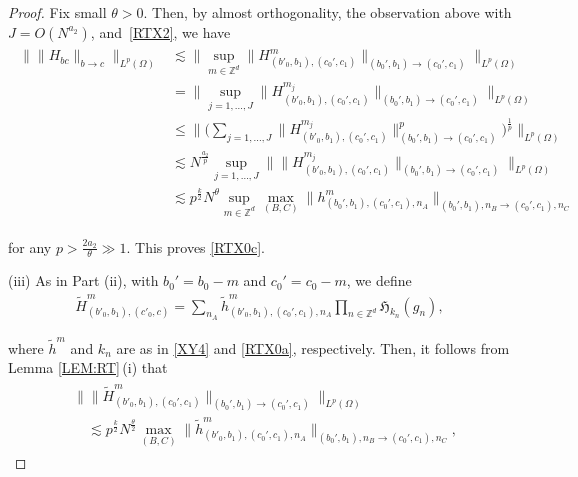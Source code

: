 \documentclass[%
11pt,  reqno]{amsart}
\newcommand{\1}{\hspace{0.2mm}\text{I}\hspace{0.2mm}}
\newcommand{\noi}{\noindent}
\newcommand{\Z}{\mathbb{Z}}
\newcommand{\wt}{\widetilde}
\newcommand{\ta}{\theta}
\renewcommand{\O}{\Omega}
\newcommand{\les}{\lesssim}
\numberwithin{equation}{section}
\numberwithin{theorem}{section}
\newcommand{\Hf}{\mathfrak{H}}
\begin{document}
\begin{proof}
Fix small $\ta > 0$.
Then, by almost orthogonality, the observation above
with $J =O(N^{a_2})$,  and~\eqref{RTX2}, we have
\begin{align}
\begin{split}
\big\| \| H_{bc} \|_{b \to c} \big\|_{L^p(\O)}  
& \les \Big\| \sup_{m \in \Z^d} 
 \| H_{(b'_0, b_1), (c_0', c_1)}^m \|_{(b_0', b_1) \to (c_0', c_1)}  \Big\|_{L^p(\O)} \\
& =  \Big\| \sup_{j = 1, \dots, J} 
 \| H_{(b'_0, b_1), (c_0', c_1)}^{m_j} \|_{(b_0', b_1) \to (c_0', c_1)} 
 \Big\|_{L^p(\O)} \\
& \le
  \bigg\| \Big(\sum_{j = 1, \dots, J} 
   \| H_{(b'_0, b_1), (c_0', c_1)}^{m_j} \|_{(b_0', b_1) \to (c_0', c_1)}^p 
 \Big)^\frac 1p\bigg\|_{L^p(\O)} \\
& \les
N^{\frac{a_2}{p}}
\sup_{j = 1, \dots, J}
  \big\|  
   \| H_{(b'_0, b_1), (c_0', c_1)}^{m_j} \|_{(b_0', b_1) \to (c_0', c_1)}  \big\|_{L^p(\O)} \\
 & \les
 p^{\frac k2} N^{\theta}
 \sup_{m \in \Z^d}
 \max_{(B,C)} \| h^m_{(b_0', b_1), (c_0', c_1), n_A}  \|_{(b_0', b_1), n_B \to (c_0', c_1),  n_C}
%
\end{split}
\label{RTX3}
 \end{align}

\noi
for any $p > \frac{2a_2}{\ta} \gg 1$.
This proves
\eqref{RTX0c}.


\medskip


\noi
(iii)
As in Part (ii), with $b_0' = b_0-m$ and $c_0' = c_0-m$, 
we define 
\begin{align}
\wt H^m_{(b'_0, b_1),  (c'_0, c)} = \sum_{n_A} \wt h^m_{(b'_0, b_1), (c_0', c_1), n_A} 
\prod_{n \in \Z^d} 
\Hf_{k_n}(g_{n}), 
\label{XY3}
\end{align}



\noi
where $\wt h^m$ and $k_n$ are as in \eqref{XY4} and \eqref{RTX0a}, respectively.
Then, 
it follows from 
 Lemma \ref{LEM:RT}\,(i) that 
\begin{align}
\begin{split}
&  \big\| \| \wt H_{(b'_0, b_1), (c_0', c_1)}^m \|_{(b_0', b_1) \to (c_0', c_1)} \big\|_{L^p(\O)} \\
& \quad 
 \les p^{\frac k2} N^{\frac \theta2}
  \max_{(B,C)} \|
\wt h^m_{(b'_0, b_1), (c_0', c_1), n_A} \|_{(b_0', b_1), n_B \to (c_0', c_1),  n_C}, 
\end{split}
\label{XY5}
\end{align}


\end{proof}
\end{document}
